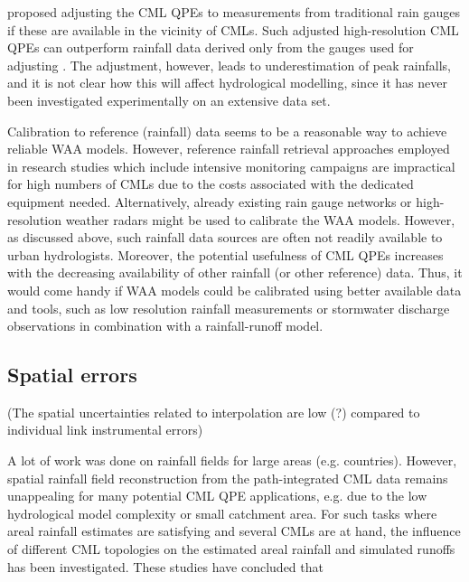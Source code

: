 \documentclass{ctuthesis}\usepackage[]{graphicx}\usepackage[]{color}
\begin{document}
\cite{fenclGaugeadjustedRainfallEstimates2017} proposed adjusting the CML QPEs to measurements from traditional rain gauges if these are available in the vicinity of CMLs. Such adjusted high-resolution CML QPEs can outperform rainfall data derived only from the gauges used for adjusting \citep{fenclGaugeadjustedRainfallEstimates2017}. The adjustment, however, leads to underestimation of peak rainfalls, and it is not clear how this will affect hydrological modelling, since it has never been investigated experimentally on an extensive data set.


Calibration to reference (rainfall) data seems to be a reasonable way to achieve reliable WAA models. However, reference rainfall retrieval approaches employed in research studies which include intensive monitoring campaigns \citep[e.g.][]{schleissQuantificationModelingWetAntenna2013, lethMeasurementCampaignAssess2018} are impractical for high numbers of CMLs due to the costs associated with the dedicated equipment needed. Alternatively, already existing rain gauge networks or high-resolution weather radars might be used to calibrate the WAA models. However, as discussed above, such rainfall data sources are often not readily available to urban hydrologists. Moreover, the potential usefulness of CML QPEs increases with the decreasing availability of other rainfall (or other reference) data. Thus, it would come handy if WAA models could be calibrated using better available data and tools, such as low resolution rainfall measurements or stormwater discharge observations in combination with a rainfall-runoff model.



\subsection{Spatial errors}
(The spatial uncertainties related to interpolation are low (?) compared to individual link instrumental errors)

A lot of work was done on rainfall fields for large areas (e.g. countries). However, spatial rainfall field reconstruction from the path-integrated CML data \citep{damicoUseOperationalMicrowave2016, goldshteinRainRateEstimation2009, haeseStochasticReconstructionInterpolation2017} remains unappealing for many potential CML QPE applications, e.g. due to the low hydrological model complexity or small catchment area. For such tasks where areal rainfall estimates are satisfying and several CMLs are at hand, the influence of different CML topologies on the estimated areal rainfall \citep{fenclCommercialMicrowaveLinks2015} and simulated runoffs \citep{pastorekCommercialMicrowaveLinks2019} has been investigated. These studies have concluded that
\end{document}
